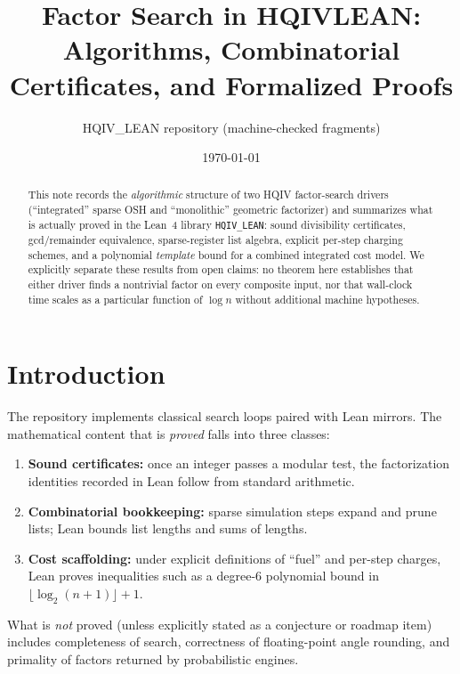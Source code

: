 \documentclass[11pt,a4paper]{article}
\title{Factor Search in HQIV\textunderscore LEAN:\\
Algorithms, Combinatorial Certificates, and Formalized Proofs}
\author{HQIV\_LEAN repository (machine-checked fragments)}
\date{\today}
\theoremstyle{plain}
\theoremstyle{definition}
\theoremstyle{remark}
\begin{document}
\maketitle

\begin{abstract}
This note records the \emph{algorithmic} structure of two HQIV factor-search drivers
(``integrated'' sparse OSH and ``monolithic'' geometric factorizer) and summarizes
what is actually proved in the Lean~4 library \texttt{HQIV\_LEAN}: sound divisibility
certificates, gcd/remainder equivalence, sparse-register list algebra, explicit
per-step charging schemes, and a polynomial \emph{template} bound for a combined
integrated cost model. We explicitly separate these results from open claims:
no theorem here establishes that either driver finds a nontrivial factor on every
composite input, nor that wall-clock time scales as a particular function of $\log n$
without additional machine hypotheses.
\end{abstract}



\tableofcontents

\section{Introduction}

The repository implements classical search loops paired with Lean mirrors. The
mathematical content that is \emph{proved} falls into three classes:
\begin{enumerate}[label=(\roman*)]
\item \textbf{Sound certificates:} once an integer passes a modular test, the
      factorization identities recorded in Lean follow from standard arithmetic.
\item \textbf{Combinatorial bookkeeping:} sparse simulation steps expand and prune
      lists; Lean bounds list lengths and sums of lengths.
\item \textbf{Cost scaffolding:} under explicit definitions of ``fuel'' and per-step
      charges, Lean proves inequalities such as a degree-$6$ polynomial bound in
      $\lfloor \log_2(n+1)\rfloor + 1$.
\end{enumerate}

What is \emph{not} proved (unless explicitly stated as a conjecture or roadmap item)
includes completeness of search, correctness of floating-point angle rounding, and
primality of factors returned by probabilistic engines.
\end{document}
